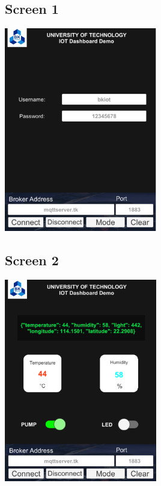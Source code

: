 \documentclass[a4paper,11pt]{article}
\theoremstyle{mytheor}
\begin{document}
\subsection{Screen 1}

\begin{center}
    \includegraphics[width=0.5\textwidth]{Scene1.png}\\
\end{center}

\subsection{Screen 2}

\begin{center}
    \includegraphics[width=0.5\textwidth]{Scene2.png}\\
\end{center}
\end{document}
